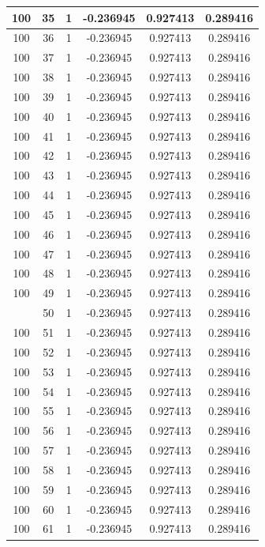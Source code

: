 \documentclass[12pt,a4paper]{article}
\numberwithin{equation}{section}
\numberwithin{figure}{section}
\numberwithin{table}{section}
\begin{document}
\begin{longtable}{|c|c|c|c|c|c|}
100 & 35 & 1 & -0.236945 & 0.927413 & 0.289416 \\ \hline
100 & 36 & 1 & -0.236945 & 0.927413 & 0.289416 \\ \hline
100 & 37 & 1 & -0.236945 & 0.927413 & 0.289416 \\ \hline
100 & 38 & 1 & -0.236945 & 0.927413 & 0.289416 \\ \hline
100 & 39 & 1 & -0.236945 & 0.927413 & 0.289416 \\ \hline
100 & 40 & 1 & -0.236945 & 0.927413 & 0.289416 \\ \hline
100 & 41 & 1 & -0.236945 & 0.927413 & 0.289416 \\ \hline
100 & 42 & 1 & -0.236945 & 0.927413 & 0.289416 \\ \hline
100 & 43 & 1 & -0.236945 & 0.927413 & 0.289416 \\ \hline
100 & 44 & 1 & -0.236945 & 0.927413 & 0.289416 \\ \hline
100 & 45 & 1 & -0.236945 & 0.927413 & 0.289416 \\ \hline
100 & 46 & 1 & -0.236945 & 0.927413 & 0.289416 \\ \hline
100 & 47 & 1 & -0.236945 & 0.927413 & 0.289416 \\ \hline
100 & 48 & 1 & -0.236945 & 0.927413 & 0.289416 \\ \hline
100 & 49 & 1 & -0.236945 & 0.927413 & 0.289416 \\ \hline
\pagebreak
100 & 50 & 1 & -0.236945 & 0.927413 & 0.289416 \\ \hline
100 & 51 & 1 & -0.236945 & 0.927413 & 0.289416 \\ \hline
100 & 52 & 1 & -0.236945 & 0.927413 & 0.289416 \\ \hline
100 & 53 & 1 & -0.236945 & 0.927413 & 0.289416 \\ \hline
100 & 54 & 1 & -0.236945 & 0.927413 & 0.289416 \\ \hline
100 & 55 & 1 & -0.236945 & 0.927413 & 0.289416 \\ \hline
100 & 56 & 1 & -0.236945 & 0.927413 & 0.289416 \\ \hline
100 & 57 & 1 & -0.236945 & 0.927413 & 0.289416 \\ \hline
100 & 58 & 1 & -0.236945 & 0.927413 & 0.289416 \\ \hline
100 & 59 & 1 & -0.236945 & 0.927413 & 0.289416 \\ \hline
100 & 60 & 1 & -0.236945 & 0.927413 & 0.289416 \\ \hline
100 & 61 & 1 & -0.236945 & 0.927413 & 0.289416 \\ \hline

\end{longtable}
\end{document}
